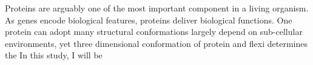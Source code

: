 Proteins are arguably one of the most important component in a living organism. As genes encode biological features, proteins deliver biological functions. One protein can adopt many structural conformations largely depend on sub-cellular environments, yet three dimensional conformation of protein and flexi determines the     In this study, I will be 